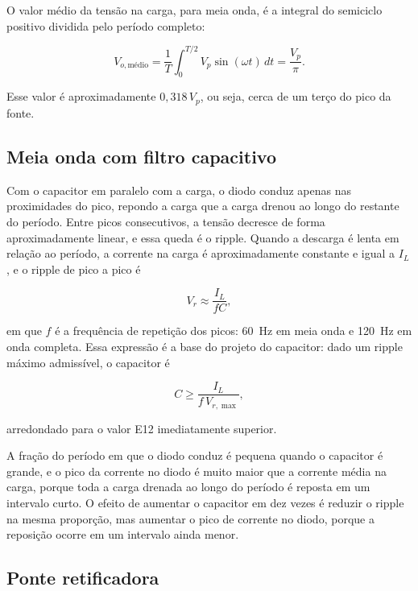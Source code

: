 \documentclass[11pt,a4paper]{article}
\begin{document}
O valor médio da tensão na carga, para meia onda, é a integral do semiciclo positivo dividida pelo período completo:
 
\begin{equation}
V_{o,\text{médio}} = \frac{1}{T} \int_0^{T/2} V_p \sin(\omega t) \, dt = \frac{V_p}{\pi} .
\label{eq:meia_onda_medio}
\end{equation}
 
Esse valor é aproximadamente \(0{,}318 \, V_p\), ou seja, cerca de um terço do pico da fonte.
 
\subsection{Meia onda com filtro capacitivo}
 
Com o capacitor em paralelo com a carga, o diodo conduz apenas nas proximidades do pico, repondo a carga que a carga drenou ao longo do restante do período. Entre picos consecutivos, a tensão decresce de forma aproximadamente linear, e essa queda é o ripple. Quando a descarga é lenta em relação ao período, a corrente na carga é aproximadamente constante e igual a \(I_L\), e o ripple de pico a pico é
 
\begin{equation}
V_r \approx \frac{I_L}{f C} ,
\label{eq:ripple}
\end{equation}
 
em que \(f\) é a frequência de repetição dos picos: \SI{60}{\hertz} em meia onda e \SI{120}{\hertz} em onda completa. Essa expressão é a base do projeto do capacitor: dado um ripple máximo admissível, o capacitor é
 
\begin{equation}
C \geq \frac{I_L}{f \, V_{r,\max}} ,
\label{eq:capacitor}
\end{equation}
 
arredondado para o valor E12 imediatamente superior.
 
A fração do período em que o diodo conduz é pequena quando o capacitor é grande, e o pico da corrente no diodo é muito maior que a corrente média na carga, porque toda a carga drenada ao longo do período é reposta em um intervalo curto. O efeito de aumentar o capacitor em dez vezes é reduzir o ripple na mesma proporção, mas aumentar o pico de corrente no diodo, porque a reposição ocorre em um intervalo ainda menor.
 
\subsection{Ponte retificadora}
 
\end{document}
